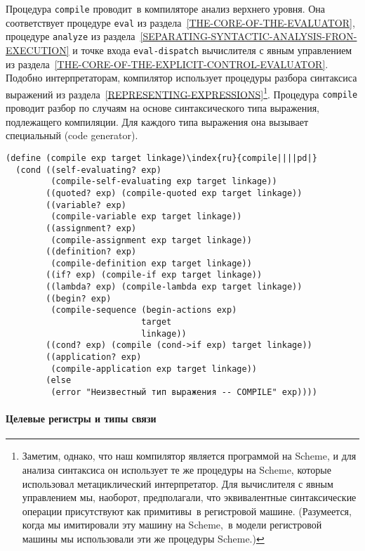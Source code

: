 Процедура {\tt compile} проводит~в компиляторе
анализ верхнего уровня.  Она соответствует процедуре {\tt eval}
из раздела~\ref{THE-CORE-OF-THE-EVALUATOR}, процедуре
{\tt analyze} из 
раздела~\ref{SEPARATING-SYNTACTIC-ANALYSIS-FRON-EXECUTION} и точке
входа {\tt eval-dis\-patch} вычислителя с явным управлением из
раздела~\ref{THE-CORE-OF-THE-EXPLICIT-CONTROL-EVALUATOR}.
Подобно интерпретаторам, компилятор использует процедуры разбора
синтаксиса выражений из 
раздела~\ref{REPRESENTING-EXPRESSIONS}\footnote{Заметим, однако, что наш компилятор является программой
на Scheme, и для анализа синтаксиса он использует те же процедуры на
Scheme, которые использовал метациклический интерпретатор.  Для
вычислителя с явным управлением мы, наоборот,
предполагали, что эквивалентные синтаксические операции присутствуют
как примитивы~в регистровой машине.  (Разумеется, когда мы имитировали
эту машину на Scheme,~в модели регистровой машины мы
использовали эти же процедуры Scheme.)
}.
Процедура {\tt compile} проводит разбор по случаям на основе
синтаксического типа выражения, подлежащего компиляции.  Для каждого
типа выражения она вызывает специальный  (code generator).

\begin{Verbatim}[fontsize=\small]
(define (compile exp target linkage)\index{ru}{compile||||pd|}
  (cond ((self-evaluating? exp)
         (compile-self-evaluating exp target linkage))
        ((quoted? exp) (compile-quoted exp target linkage))
        ((variable? exp)
         (compile-variable exp target linkage))
        ((assignment? exp)
         (compile-assignment exp target linkage))
        ((definition? exp)
         (compile-definition exp target linkage))
        ((if? exp) (compile-if exp target linkage))
        ((lambda? exp) (compile-lambda exp target linkage))
        ((begin? exp)
         (compile-sequence (begin-actions exp)
                           target
                           linkage))
        ((cond? exp) (compile (cond->if exp) target linkage))
        ((application? exp)
         (compile-application exp target linkage))
        (else
         (error "Неизвестный тип выражения -- COMPILE" exp))))
\end{Verbatim}

\paragraph{Целевые регистры и типы связи}


